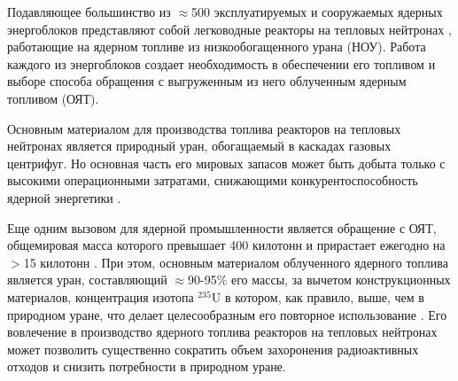 {\actuality}

Подавляющее большинство из $\approx$500 эксплуатируемых и сооружаемых ядерных энергоблоков представляют собой легководные реакторы на тепловых нейтронах \cite{PRISHome}, работающие на ядерном топливе из низкообогащенного урана (НОУ). Работа каждого из энергоблоков создает необходимость в обеспечении его топливом и выборе способа обращения с выгруженным из него облученным ядерным топливом (ОЯТ).

Основным материалом для производства топлива реакторов на тепловых нейтронах является природный уран, обогащаемый в каскадах газовых центрифуг. Но основная часть его мировых запасов может быть добыта только с высокими операционными затратами, снижающими конкурентоспособность ядерной энергетики \cite{Uranium2022,WorldDistributionUranium2018,hartardCompetitionConflictsResource2015}. 

Еще одним вызовом для ядерной промышленности является обращение с ОЯТ, общемировая масса которого превышает 400 килотонн и прирастает ежегодно на $>$15 килотонн \cite{kaygorodcevProblemyPerspektivyRazvitiya2021,UseReprocessedUranium2020WNA}. При этом, основным материалом облученного ядерного топлива является уран, составляющий $\approx$90-95\% его массы, за вычетом конструкционных материалов, концентрация изотопа $^{235}$U в котором, как правило, выше, чем в природном уране, что делает целесообразным его повторное использование \cite{24NikipelovNikipelovSudby}. Его вовлечение в производство ядерного топлива реакторов на тепловых нейтронах может позволить существенно сократить объем захоронения радиоактивных отходов и снизить потребности в природном уране.

